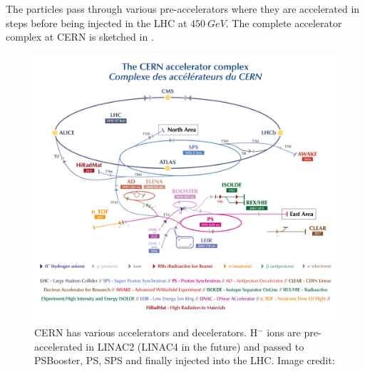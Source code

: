 The particles pass through various pre-accelerators where they are accelerated in steps before being
injected in the LHC at $\SI{450}{GeV}$. The complete accelerator complex at CERN is sketched in
.

\begin{figure}[h]
    \centering
    \includegraphics[width=\textwidth]{CCC-v2019-final-white_small}
    \caption{CERN has various accelerators and decelerators. H$^-$ ions are pre-accelerated
    in LINAC2 (LINAC4 in the future) and passed to PSBooster, PS, SPS and finally injected into
    the LHC. Image credit: \cite{CERN_AccCmplx}}
    \label{fig_cern_acc_cmplx}
\end{figure}
